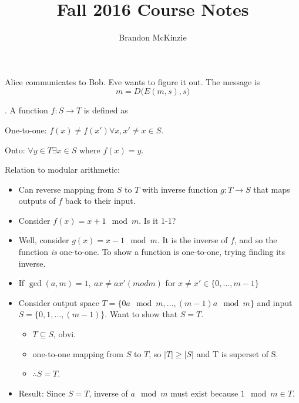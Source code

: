 \documentclass[12pt]{article}
\title{\vspace{-10mm}\fontsize{24pt}{8pt}\selectfont\textbf{Fall 2016 Course Notes}\vspace*{-4mm}}
\author{Brandon McKinzie}
\date{}
\newcommand\p{\Needspace{12\baselineskip} \noindent}
\begin{document}
\dosecttoc

\label{Discrete Math and Probability}

	\p {} Alice communicates to Bob. Eve wants to figure it out. The message is
	\begin{equation}
		m = D\big(E(m, s), s\big)
	\end{equation}
	
	\p {}. A  function $f:S\rightarrow T$ is defined as
	\begin{compactitem}
		\item One-to-one: $f(x) \ne f(x') \forall x, x'\ne x \in S$. 
		\item Onto: $\forall y \in T \exists x \in S$ where $f(x) = y$. 
	\end{compactitem}
	 Relation to modular arithmetic: 
	\begin{itemize}[$\rightarrow$]
		\item Can reverse mapping from $S$ to $T$ with inverse function $g:T\rightarrow S$ that maps outputs of $f$ back to their input. 
		\item Consider $f(x) = x + 1 \mod{m}$. Is it 1-1?
		\item Well, consider $g(x) = x - 1 \mod{m}$. It is the inverse of $f$, and so the function \emph{is} one-to-one.  To show a function is one-to-one, trying finding its inverse. 
		\item {} If $\gcd(a, m) = 1,~ax \ne ax' (mod m)$ for $x \ne x' \in \{0, \ldots, m-1\}$ 
		\item Consider output space $T = \{0a\mod{m}, \ldots, (m-1) a \mod{m} \}$ and input $S=\{0, 1, \ldots, (m-1)\}$. Want to show that $S = T$. 
		\begin{itemize}
			\item $T \subseteq S$, obvi. 
			\item one-to-one mapping from $S$ to $T$, so $|T| \ge |S|$ and T is superset of S. 
			\item $\therefore S = T$. 
		\end{itemize}
		\item Result: Since $S = T$, inverse of $a \mod{m}$ must exist because $1 \mod{m} \in T$. 
	\end{itemize} 
\end{document}
